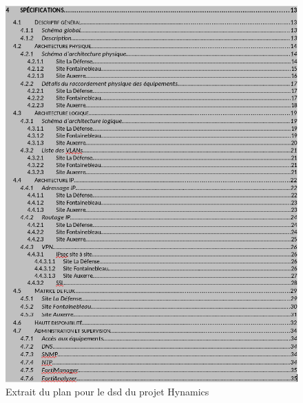 \documentclass[12pt, oneside, a4paper, titlepage]{report}
\begin{document}
\begin{figure}[h!]
    \centering
    \includegraphics[width = \linewidth]{img/doc-hy/dsd.png}
    \caption{Extrait du plan pour le \gls{dsd} du projet Hynamics}%
    \label{fig:doc-hy/dsd}
\end{figure}
\end{document}
